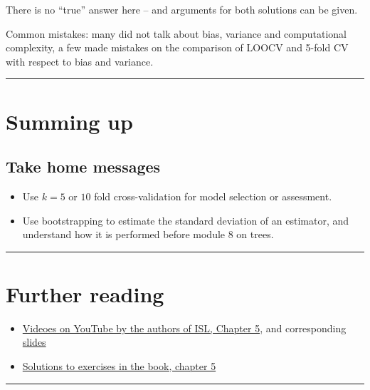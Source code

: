 \documentclass[]{article}
\providecommand{\tightlist}{%
  \setlength{\itemsep}{0pt}\setlength{\parskip}{0pt}}
\begin{document}
There is no ``true'' answer here -- and arguments for both solutions can
be given.

Common mistakes: many did not talk about bias, variance and
computational complexity, a few made mistakes on the comparison of LOOCV
and 5-fold CV with respect to bias and variance.

\begin{center}\rule{0.5\linewidth}{\linethickness}\end{center}

\section{Summing up}\label{summing-up}

\subsection{Take home messages}\label{take-home-messages}

\begin{itemize}
\tightlist
\item
  Use \(k=5\) or \(10\) fold cross-validation for model selection or
  assessment.
\item
  Use bootstrapping to estimate the standard deviation of an estimator,
  and understand how it is performed before module 8 on trees.
\end{itemize}

\begin{center}\rule{0.5\linewidth}{\linethickness}\end{center}

\section{ Further reading }\label{further-reading}

\begin{itemize}
\tightlist
\item
  \href{https://www.youtube.com/playlist?list=PL5-da3qGB5IA6E6ZNXu7dp89_uv8yocmf}{Videoes
  on YouTube by the authors of ISL, Chapter 5}, and corresponding
  \href{https://lagunita.stanford.edu/c4x/HumanitiesScience/StatLearning/asset/cv_boot.pdf}{slides}
\item
  \href{https://rstudio-pubs-static.s3.amazonaws.com/65561_43c0eaaa8565414eae333b47038f716c.html}{Solutions
  to exercises in the book, chapter 5}
\end{itemize}

\begin{center}\rule{0.5\linewidth}{\linethickness}\end{center}
\end{document}
